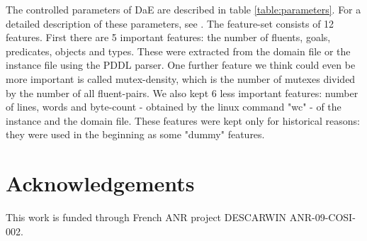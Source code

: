 \documentclass{article}
\begin{document}
The controlled parameters of DaE are described in table \ref{table:parameters}. For a detailed description of these parameters, see \cite{BibGECCO:2010}. The feature-set consists of 12 features. First there are 5 important features: the number of fluents, goals, predicates, objects and types. These were extracted from the domain file or the instance file using the PDDL parser. One further feature we think could even be more important is called mutex-density, which is the number of mutexes divided by the number of all fluent-pairs. We also kept 6 less important features: number of lines, words and byte-count - obtained by the linux command "wc" - of the instance and the domain file. These features were kept only for historical reasons: they were used in the beginning as some "dummy" features.

\section{Acknowledgements}
This work is funded through French ANR project DESCARWIN ANR-09-COSI-002.\\~\\



\end{document}
